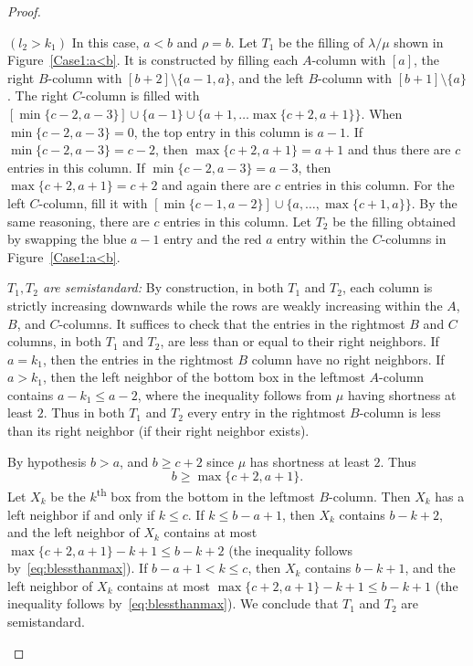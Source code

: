 \begin{proof}
\begin{Case}
{ $(l_2 > k_1)$} In this case, $a<b$ and $\rho = b$. Let $T_1$ be the filling of $\lambda/\mu$ shown in Figure~\ref{Case1:a<b}. It is constructed by filling each $A$-column with $[a]$, the right $B$-column with $[b+2]\setminus \{a-1,a\}$, and the left $B$-column with $[b+1]\setminus \{a\}$. The right $C$-column is filled with $[\min\{c-2,a-3\}] \cup \{a-1\} \cup \{a+1,\ldots \max\{c+2,a+1\}\}$. When $\min\{c-2,a-3\}= 0$, the top entry in this column is $a-1$. If $\min\{c-2,a-3\} = c-2$, then $\max\{c+2,a+1\} = a+1$ and thus there are $c$ entries in this column. If $\min\{c-2,a-3\} = a-3$, then $\max\{c+2,a+1\} = c+2$ and again there are $c$ entries in this column. For the left $C$-column, fill it with $[\min\{c-1,a-2\}]\cup \{a,\ldots, \max\{c+1,a\}\}$. By the same reasoning, there are $c$ entries in this column. Let $T_2$ be the filling obtained by swapping the blue $a-1$ entry and the red $a$ entry within the $C$-columns in Figure~\ref{Case1:a<b}. 

\emph{$T_1, T_2$ are semistandard:} By construction, in both $T_1$ and $T_2$, each column is strictly increasing downwards while the rows are weakly increasing within the $A$, $B$, and $C$-columns. It suffices to check that the entries in the rightmost $B$ and $C$ columns, in both $T_1$ and $T_2$, are less than or equal to their right neighbors. If $a=k_1$, then the entries in the rightmost $B$ column have no right neighbors. If $a > k_1$, then the left neighbor of the bottom box in the leftmost $A$-column contains $a - k_1 \leq a - 2$, where the inequality follows from $\mu$ having shortness at least $2$. Thus in both $T_1$ and $T_2$ every entry in the rightmost $B$-column is less than its right neighbor (if their right neighbor exists). 

By hypothesis $b>a$, and $b \geq c+2$ since $\mu$ has shortness at least $2$. Thus 
\begin{equation}
\label{eq:blessthanmax}
b \geq \max\{c+2,a+1\}.
\end{equation}
Let $X_k$ be the $k$\textsuperscript{th} box from the bottom in the leftmost $B$-column. Then $X_k$ has a left neighbor if and only if $k \leq c$. If $k \leq b-a + 1$, then $X_k$ contains $b-k+2$, and the left neighbor of $X_k$ contains at most $\max\{c+2,a+1\}-k+1 \leq b-k+2$ (the inequality follows by~\eqref{eq:blessthanmax}). If $b-a+1 < k \leq c$, then $X_k$ contains $b-k+1$, and the left neighbor of $X_k$ contains at most $\max\{c+2,a+1\}-k+1 \leq b-k+1$ (the inequality follows by~\eqref{eq:blessthanmax}). We conclude that $T_1$ and $T_2$ are semistandard.




\end{Case}
\end{proof}
